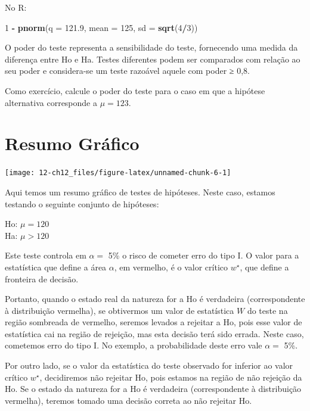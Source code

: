 \documentclass[
]{book}
\newenvironment{Shaded}{\begin{snugshade}}{\end{snugshade}}
\newcommand{\DataTypeTok}[1]{\textcolor[rgb]{0.13,0.29,0.53}{#1}}
\newcommand{\DecValTok}[1]{\textcolor[rgb]{0.00,0.00,0.81}{#1}}
\newcommand{\FloatTok}[1]{\textcolor[rgb]{0.00,0.00,0.81}{#1}}
\newcommand{\KeywordTok}[1]{\textcolor[rgb]{0.13,0.29,0.53}{\textbf{#1}}}
\newcommand{\NormalTok}[1]{#1}
\newcommand{\OperatorTok}[1]{\textcolor[rgb]{0.81,0.36,0.00}{\textbf{#1}}}
\newcommand{\StringTok}[1]{\textcolor[rgb]{0.31,0.60,0.02}{#1}}
\theoremstyle{definition}
\theoremstyle{definition}
\theoremstyle{definition}
\theoremstyle{remark}
\begin{document}
No R:

\begin{Shaded}
\begin{Highlighting}[]
\DecValTok{1} \OperatorTok{-}\StringTok{ }\KeywordTok{pnorm}\NormalTok{(}\DataTypeTok{q =} \FloatTok{121.9}\NormalTok{, }\DataTypeTok{mean =} \DecValTok{125}\NormalTok{, }\DataTypeTok{sd =} \KeywordTok{sqrt}\NormalTok{(}\DecValTok{4}\OperatorTok{/}\DecValTok{3}\NormalTok{))}
\end{Highlighting}
\end{Shaded}

O poder do teste representa a sensibilidade do teste, fornecendo uma medida da diferença entre Ho e Ha. Testes diferentes podem ser comparados com relação ao seu poder e considera-se um teste razoável aquele com poder ≥ 0,8.

Como exercício, calcule o poder do teste para o caso em que a hipótese alternativa corresponde a \(\mu = 123\).

\hypertarget{resumo-gruxe1fico}{%
\section{Resumo Gráfico}\label{resumo-gruxe1fico}}

\texttt{[image: 12-ch12\_files/figure-latex/unnamed-chunk-6-1]}

Aqui temos um resumo gráfico de testes de hipóteses. Neste caso, estamos testando o seguinte conjunto de hipóteses:

Ho: \(\mu = 120\)\\
Ha: \(\mu > 120\)

Este teste controla em \(\alpha =\) 5\% o risco de cometer erro do tipo I. O valor para a estatística que define a área \(\alpha\), em vermelho, é o valor crítico \(w^\star\), que define a fronteira de decisão.

Portanto, quando o estado real da natureza for a Ho é verdadeira (correspondente à distribuição vermelha), se obtivermos um valor de estatística \(W\) do teste na região sombreada de vermelho, seremos levados a rejeitar a Ho, pois esse valor de estatística cai na região de rejeição, mas esta decisão terá sido errada. Neste caso, cometemos erro do tipo I. No exemplo, a probabilidade deste erro vale \(\alpha =\) 5\%.

Por outro lado, se o valor da estatística do teste observado for inferior ao valor crítico \(w^\star\), decidiremos não rejeitar Ho, pois estamos na região de não rejeição da Ho. Se o estado da natureza for a Ho é verdadeira (correspondente à distribuição vermelha), teremos tomado uma decisão correta ao não rejeitar Ho.
\end{document}
